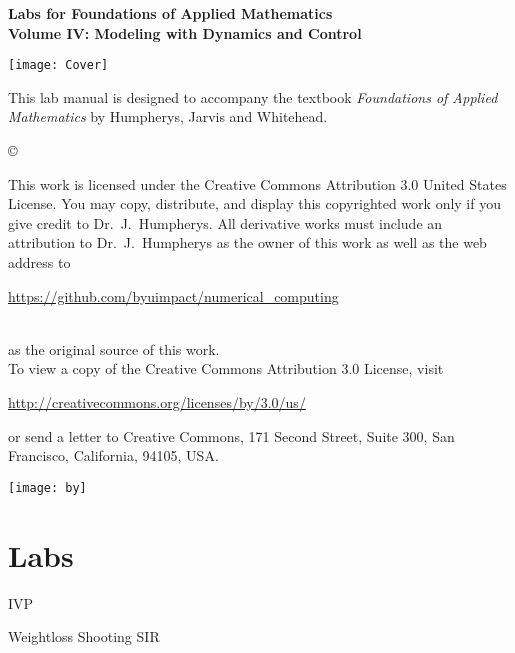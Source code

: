 \documentclass[nociteref]{SIAM-GH-book}
\begin{document}
\thispagestyle{empty}
\begin{center}
{\huge \bf Labs for Foundations of Applied Mathematics} \\
\vspace{5mm}
{\Large \bf Volume IV: Modeling with
Dynamics and Control}
\vspace{20mm}

\texttt{[image: Cover]}
\end{center}
\frontmatter




\begin{thepreface}
This lab manual is designed to accompany the textbook \emph{Foundations of Applied Mathematics} by Humpherys, Jarvis and Whitehead.

\vfill
\copyright{This work is licensed under the Creative Commons Attribution 3.0 United States
License.  You may copy, distribute, and display this copyrighted work only if you give
credit to Dr.~J.~Humpherys. All derivative works must include an attribution to Dr.~J.~Humpherys as the owner of this work as well as the web address to
\\\centerline{\url{https://github.com/byuimpact/numerical_computing}}\\ as the original source of
this
work.\\To view a copy of the Creative Commons Attribution 3.0 License,
visit\\\centerline{\url{http://creativecommons.org/licenses/by/3.0/us/}} or send a letter to
Creative Commons, 171 Second Street, Suite 300, San Francisco, California, 94105, USA.}

\vfill
\centering\texttt{[image: by]}
\vfill
\end{thepreface}

\setcounter{tocdepth}{1}
\tableofcontents

\mainmatter

\part{Labs}
{IVP}

{Weightloss}
{Shooting}
{SIR}
\end{document}
